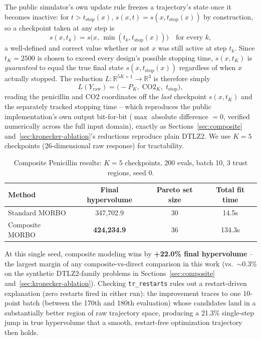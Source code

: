 \documentclass[11pt]{article}
\begin{document}
The public simulator's own update rule freezes a trajectory's state once it
becomes inactive: for $t > t_{\mathrm{stop}}(x)$, $s(x,t) = s(x, t_{\mathrm{stop}}(x))$
by construction, so a checkpoint taken at any step is
\begin{equation}
  s(x, t_k) = s\big(x,\, \min(t_k, t_{\mathrm{stop}}(x))\big) \quad \text{for every } k,
\end{equation}
a well-defined and correct value whether or not $x$ was still active at
step $t_k$. Since $t_K = 2500$ is chosen to exceed every design's possible
stopping time, $s(x, t_K)$ is \emph{guaranteed} to equal the true final
state $s(x, t_{\mathrm{stop}}(x))$ regardless of when $x$ actually stopped.
The reduction $L: \mathbb{R}^{5K+1} \to \mathbb{R}^3$ is therefore simply
\begin{equation}
  L(Y_{\mathrm{raw}}) = \big(-P_K,\; \mathrm{CO2}_K,\; t_{\mathrm{stop}}\big),
\end{equation}
reading the penicillin and CO2 coordinates off the \emph{last} checkpoint
$s(x, t_K)$ and the separately tracked stopping time -- which reproduces
the public implementation's own output bit-for-bit
($\max$ absolute difference $=0$, verified numerically across the full
input domain), exactly as Sections~\ref{sec:composite}
and~\ref{sec:kronecker-ablation}'s reductions reproduce plain DTLZ2. We use
$K=5$ checkpoints (26-dimensional raw response) for tractability.

\begin{table}[h]
\centering
\caption{Composite Penicillin results: $K=5$ checkpoints, 200 evals, batch 10, 3 trust regions, seed 0.}
\label{tab:penicillin-results}
\begin{tabular}{lccc}
\toprule
Method & Final hypervolume & Pareto set size & Total fit time \\
\midrule
Standard MORBO & 347{,}702.9 & 30 & 14.5s \\
Composite MORBO & \textbf{424{,}234.9} & 36 & 134.3s \\
\bottomrule
\end{tabular}
\end{table}

At this single seed, composite modeling wins by \textbf{+22.0\% final
hypervolume} -- the largest margin of any composite-vs-direct comparison
in this work (vs.\ $\sim$0.3\% on the synthetic DTLZ2-family problems in
Sections~\ref{sec:composite} and~\ref{sec:kronecker-ablation}). Checking
\texttt{tr\_restarts} rules out a restart-driven explanation (zero
restarts fired in either run): the improvement traces to one 10-point
batch (between the 170th and 180th evaluation) whose candidates land in
a substantially better region of raw trajectory space, producing a
21.3\% single-step jump in true hypervolume that a smooth, restart-free
optimization trajectory then holds.
\end{document}
